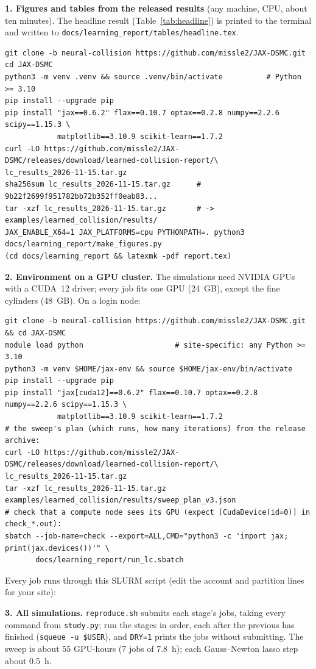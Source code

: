 \documentclass[10pt]{article}
\begin{document}
\textbf{1. Figures and tables from the released results} (any machine, CPU, about ten minutes).
The headline result (Table~\ref{tab:headline}) is printed to the terminal and written to
\texttt{docs/learning\_report/tables/headline.tex}.
{\footnotesize
\begin{verbatim}
git clone -b neural-collision https://github.com/missle2/JAX-DSMC.git
cd JAX-DSMC
python3 -m venv .venv && source .venv/bin/activate          # Python >= 3.10
pip install --upgrade pip
pip install "jax==0.6.2" flax==0.10.7 optax==0.2.8 numpy==2.2.6 scipy==1.15.3 \
            matplotlib==3.10.9 scikit-learn==1.7.2
curl -LO https://github.com/missle2/JAX-DSMC/releases/download/learned-collision-report/\
lc_results_2026-11-15.tar.gz
sha256sum lc_results_2026-11-15.tar.gz      # 9b22f2699f951782bb72b352ff0eab83...
tar -xzf lc_results_2026-11-15.tar.gz       # -> examples/learned_collision/results/
JAX_ENABLE_X64=1 JAX_PLATFORMS=cpu PYTHONPATH=. python3 docs/learning_report/make_figures.py
(cd docs/learning_report && latexmk -pdf report.tex)
\end{verbatim}}

\textbf{2. Environment on a GPU cluster.} The simulations need NVIDIA GPUs with a CUDA~12
driver; every job fits one GPU (24~GB), except the fine cylinders (48~GB). On a login node:
{\footnotesize
\begin{verbatim}
git clone -b neural-collision https://github.com/missle2/JAX-DSMC.git && cd JAX-DSMC
module load python                     # site-specific: any Python >= 3.10
python3 -m venv $HOME/jax-env && source $HOME/jax-env/bin/activate
pip install --upgrade pip
pip install "jax[cuda12]==0.6.2" flax==0.10.7 optax==0.2.8 numpy==2.2.6 scipy==1.15.3 \
            matplotlib==3.10.9 scikit-learn==1.7.2
# the sweep's plan (which runs, how many iterations) from the release archive:
curl -LO https://github.com/missle2/JAX-DSMC/releases/download/learned-collision-report/\
lc_results_2026-11-15.tar.gz
tar -xzf lc_results_2026-11-15.tar.gz examples/learned_collision/results/sweep_plan_v3.json
# check that a compute node sees its GPU (expect [CudaDevice(id=0)] in check_*.out):
sbatch --job-name=check --export=ALL,CMD="python3 -c 'import jax; print(jax.devices())'" \
       docs/learning_report/run_lc.sbatch
\end{verbatim}}
Every job runs through this SLURM script (edit the account and partition lines for your site):
{\footnotesize\VerbatimInput{run_lc.sbatch}}

\textbf{3. All simulations.} \texttt{reproduce.sh} submits each stage's jobs, taking every
command from \texttt{study.py}; run the stages in order, each after the previous has finished
(\texttt{squeue -u \$USER}), and \texttt{DRY=1} prints the jobs without submitting. The sweep
is about 55 GPU-hours (7 jobs of 7.8~h); each Gauss--Newton lasso step about 0.5~h.
{\footnotesize{}}
\end{document}
